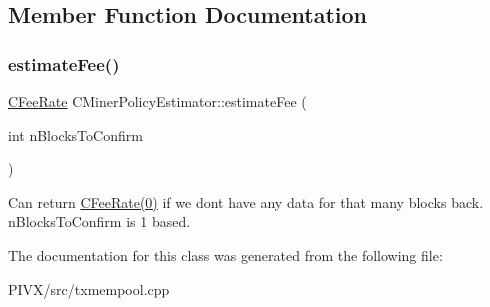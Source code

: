 \subsection{Member Function Documentation}
\mbox{\label{class_c_miner_policy_estimator_a00b6f58a508ee87999910972f37b3281}} 
\subsubsection{\texorpdfstring{estimate\+Fee()}{estimateFee()}}
{\footnotesize\ttfamily \mbox{\hyperlink{class_c_fee_rate}{C\+Fee\+Rate}} C\+Miner\+Policy\+Estimator\+::estimate\+Fee (\begin{DoxyParamCaption}\item[{int}]{n\+Blocks\+To\+Confirm }\end{DoxyParamCaption})\hspace{0.3cm}{\ttfamily [inline]}}

Can return \mbox{\hyperlink{class_c_fee_rate}{C\+Fee\+Rate(0)}} if we don\textquotesingle{}t have any data for that many blocks back. n\+Blocks\+To\+Confirm is 1 based. 

The documentation for this class was generated from the following file\+:\begin{DoxyCompactItemize}
\item 
P\+I\+V\+X/src/txmempool.\+cpp\end{DoxyCompactItemize}
